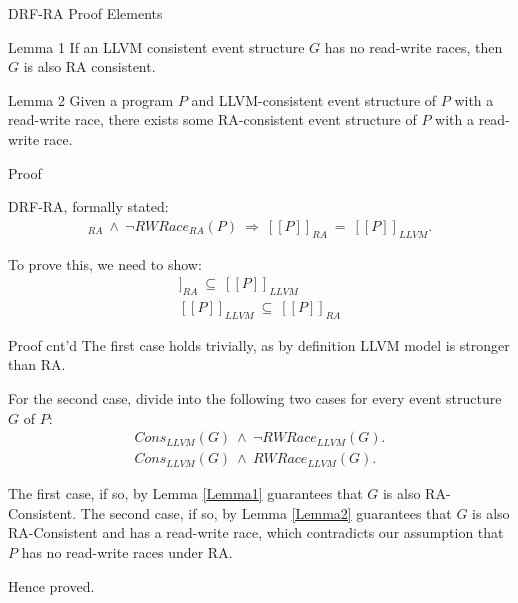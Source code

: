 \documentclass[xcolor=dvipsnames, notes]{beamer}
\begin{document}
    \begin{frame}{DRF-RA Proof Elements}

        \begin{lemma}{Lemma 1}
            If an LLVM consistent event structure $G$ has no read-write races, then $G$ is also RA consistent.  
        \end{lemma}

        \begin{lemma}{Lemma 2}
            Given a program $P$ and LLVM-consistent event structure of $P$ with a read-write race, there exists some RA-consistent event structure of $P$ with a read-write race.
        \end{lemma}
    
    \end{frame}


    \begin{frame}{Proof}

        DRF-RA, formally stated:
        \begin{align*}
            [P]_{RA} \ \wedge \ \neg RWRace_{RA}(P) \ \Rightarrow \ [[P]]_{RA} \ = \ [[P]]_{LLVM}. 
        \end{align*}

        To prove this, we need to show:
        \begin{align*}
            [[P]]_{RA} \ \subseteq \ [[P]]_{LLVM} \\
            [[P]]_{LLVM} \ \subseteq \ [[P]]_{RA}
        \end{align*}

    \end{frame}

    \begin{frame}{Proof cnt'd}
        The first case holds trivially, as by definition LLVM model is stronger than RA.

        For the second case, divide into the following two cases for every event structure $G$ of $P$:
        \begin{align*}
            Cons_{LLVM}(G) \ \wedge \ \neg RWRace_{LLVM}(G).\\
            Cons_{LLVM}(G) \ \wedge \  RWRace_{LLVM}(G).  
        \end{align*}

        The first case, if so, by Lemma \ref{Lemma1} guarantees that $G$ is also RA-Consistent.
        The second case, if so, by Lemma \ref{Lemma2} guarantees that $G$ is also RA-Consistent and has a read-write race, which contradicts our assumption that $P$ has no read-write races under RA.

        Hence proved.
    \end{frame}
\end{document}
